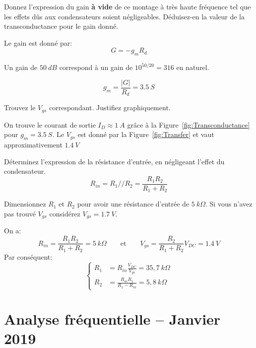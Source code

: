 \documentclass{../template/tp}
\begin{document}
\Question
{
    Donnez l'expression du gain \textbf{à vide} de ce montage à très haute fréquence tel que les effets dûs aux condensateurs soient négligeables.
    Déduisez-en la valeur de la transconductance pour le gain donné.
}{
    Le gain est donné par:
    \[G = - g_{m} R_{d}\]
    
    Un gain de $ 50~dB $ correspond à un gain de $ 10^{50/20} = 316 $ en naturel.
    
    \[ g_{m} = \frac{|G|}{R_{d}} = 3.5~S \]
}

\Question
{
    Trouvez le $ V_{gs} $ correspondant. Justifiez graphiquement.
}{
    On trouve le courant de sortie $ I_{D} \approx 1~A $ grâce à la Figure~\ref{fig:Transconductance} pour $ g_m = 3.5~S $.
    Le $ V_{gs} $ est donné par la Figure~\ref{fig:Transfer} et vaut approximativement $ 1.4~V $
    
}

\Question
{
    Déterminez l'expression de la résistance d'entrée, en négligeant l'effet du condensateur.
}{
    \[ R_{in} = R_{1} // R_{2} = \frac{R_{1} R_{2}}{R_{1} + R_{2}} \]
}

\Question
{
    Dimensionnez $ R_{1} $ et $ R_{2} $ pour avoir une résistance d'entrée de $ 5~k\Omega $. Si vous n'avez pas trouvé $ V_{gs} $ considérez $ V_{gs} = 1.7~V $.
}{
    On a:
    \[
        R_{in} = \frac{R_{1} R_{2}}{R_{1} + R_{2}} = 5~k\Omega
        \qquad\text{et}\qquad
        V_{gs} = \frac{R_{2}}{R_{1} + R_{2}} V_{DC} = 1.4~V
    \]
    Par conséquent:
    \[
        \left\{ 
            \begin{array}{ll}
                R_{1} &= R_{in} \frac{V_{DC} }{ V_{gs} } = 35,7~k\Omega\\
                R_{2} &= \frac{ R_{in} R_{1} }{ R_{1} - R_{in} } = 5,8~k\Omega
            \end{array}
        \right.
    \]
    
}

\clearpage





















\section*{Analyse fréquentielle -- Janvier 2019}
\end{document}
